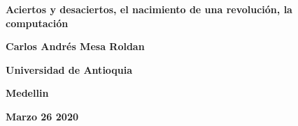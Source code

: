 \documentclass{article}
\begin{document}
\begin{center}
\bf{\sc\Huge Aciertos y desaciertos, el nacimiento de una revolución, la computación}\\
\end{center}
\vspace{120pt}
\begin{center}
\bf{\sc\Huge Carlos Andrés Mesa Roldan }\\
\end{center}
\vspace{120pt}
\begin{center}
\bf{\sc\Huge Universidad de Antioquia}\\
\end{center}
\vspace{80pt}
\begin{center}
\bf{\sc\Huge Medellin}
\end{center}
\begin{center}
\bf{\sc\Huge Marzo 26 2020}\\
\end{center}\
\newpage
\end{document}
